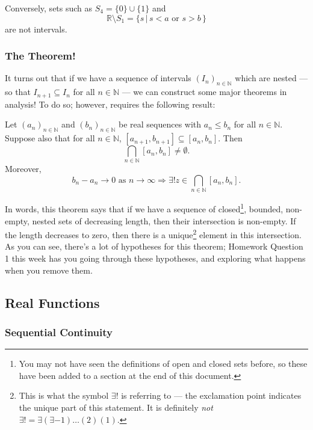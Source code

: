 \documentclass[
  17pt,
  a4paper]{extarticle}
\theoremstyle{plain}
\theoremstyle{plain}
\theoremstyle{plain}
\theoremstyle{plain}
\theoremstyle{plain}
\theoremstyle{definition}
\theoremstyle{definition}
\theoremstyle{definition}
\theoremstyle{remark}
\let\BeginKnitrBlock\begin \let\EndKnitrBlock\end
\renewcommand{\;}{\,}
\begin{document}
Conversely, sets such as \(S_4 = \lbrace 0 \rbrace \cup \lbrace 1 \rbrace\) and \[\mathbb{R}\setminus S_1 = \lbrace s \;\lvert\; s < a \;\; \text{or}\;\; s > b\;\rbrace\] are not intervals.

\hypertarget{the-theorem}{%
\subsubsection{The Theorem!}\label{the-theorem}}

It turns out that if we have a sequence of intervals \((I_n)_{n\in\mathbb{N}}\) which are nested --- so that \(I_{n+1} \subseteq I_n\) for all \(n\in\mathbb{N}\) --- we can construct some major theorems in analysis! To do so; however, requires the following result:

\BeginKnitrBlock{theorem}[Nested Intervals Theorem]
{\label{thm:thm1} }Let \((a_n)_{n\in\mathbb{N}}\) and \((b_n)_{n\in\mathbb{N}}\) be real sequences with \(a_n \leq b_n\) for all \(n\in\mathbb{N}\). Suppose also that for all \(n\in\mathbb{N}\), \([a_{n+1},b_{n+1}] \subseteq [a_{n},b_{n}]\). Then \[\bigcap_{n\in\mathbb{N}}[a_n,b_n] \neq \emptyset.\] Moreover, \[b_n - a_n \to 0 \;\;\text{as $n \to \infty$} \Longrightarrow \exists! z \in \bigcap_{n\in\mathbb{N}}[a_n,b_n].\]
\EndKnitrBlock{theorem}
In words, this theorem says that if we have a sequence of closed\footnote{You may not have seen the definitions of open and closed sets before, so these have been added to a section at the end of this document.}, bounded, non-empty, nested sets of decreasing length, then their intersection is non-empty. If the length decreases to zero, then there is a unique\footnote{This is what the symbol \(\exists!\) is referring to --- the exclamation point indicates the unique part of this statement. It is definitely \emph{not} \(\exists! = \exists(\exists-1)\ldots(2)(1).\)} element in this intersection. As you can see, there's a lot of hypotheses for this theorem; Homework Question 1 this week has you going through these hypotheses, and exploring what happens when you remove them.

\hypertarget{real-functions}{%
\subsection{Real Functions}\label{real-functions}}

\hypertarget{sequential-continuity}{%
\subsubsection{Sequential Continuity}\label{sequential-continuity}}
\end{document}
